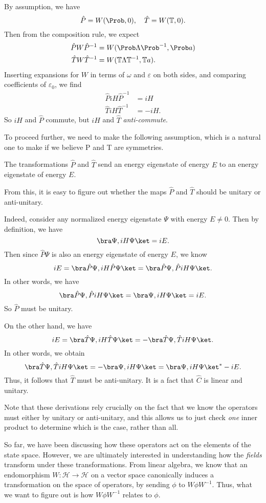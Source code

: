 \documentclass[a4paper]{article}
\begin{document}
By assumption, we have
\[
  \hat{P} = W(\Prob, 0),\quad \hat{T} = W(\mathbb{T}, 0).
\]
Then from the composition rule, we expect
\begin{align*}
  \hat{P} W \hat{P}^{-1} &= W(\Prob \Lambda \Prob^{-1}, \Prob a)\\
  \hat{T} W \hat{T}^{-1} &= W(\mathbb{T} \Lambda \mathbb{T}^{-1}, \mathbb{T} a).
\end{align*}
Inserting expansions for $W$ in terms of $\omega$ and $\varepsilon$ on both sides, and comparing coefficients of $\varepsilon_0$, we find
\begin{align*}
  \hat{P} i H \hat{P}^{-1} &= iH\\
  \hat{T} iH \hat{T}^{-1} &= -iH.
\end{align*}
So $iH$ and $\hat{P}$ commute, but $iH$ and $\hat{T}$ \emph{anti-commute}.

To proceed further, we need to make the following assumption, which is a natural one to make if we believe P and T are symmetries.
\begin{assumption}
  The transformations $\hat{P}$ and $\hat{T}$ send an energy eigenstate of energy $E$ to an energy eigenstate of energy $E$.
\end{assumption}
From this, it is easy to figure out whether the maps $\hat{P}$ and $\hat{T}$ should be unitary or anti-unitary.

Indeed, consider any normalized energy eigenstate $\Psi$ with energy $E \not = 0$. Then by definition, we have
\[
  \bra \Psi, i H \Psi\ket = iE.
\]
Then since $\hat{P}\Psi$ is also an energy eigenstate of energy $E$, we know
\[
  iE = \bra \hat{P} \Psi, iH \hat{P} \Psi\ket = \bra \hat{P} \Psi, \hat{P} iH \Psi \ket.
\]
In other words, we have
\[
  \bra \hat{P} \Psi, \hat{P} iH \Psi \ket = \bra \Psi, iH \Psi \ket = iE.
\]
So $\hat{P}$ must be unitary.

On the other hand, we have
\[
  iE = \bra \hat{T} \Psi, iH \hat{T} \Psi\ket = -\bra \hat{T} \Psi, \hat{T} iH \Psi \ket.
\]
In other words, we obtain
\[
  \bra \hat{T} \Psi, \hat{T} iH \Psi \ket = -\bra \Psi, iH \Psi \ket = \bra \Psi, iH\Psi\ket^* -iE.
\]
Thus, it follows that $\hat{T}$ must be anti-unitary. It is a fact that $\hat{C}$ is linear and unitary.

Note that these derivations rely crucially on the fact that we know the operators must either by unitary or anti-unitary, and this allows us to just check \emph{one} inner product to determine which is the case, rather than all.

So far, we have been discussing how these operators act on the elements of the state space. However, we are ultimately interested in understanding how the \emph{fields} transform under these transformations. From linear algebra, we know that an endomorphism $W: \mathcal{H} \to \mathcal{H}$ on a vector space canonically induces a transformation on the space of operators, by sending $\phi$ to $W\phi W^{-1}$. Thus, what we want to figure out is how $W \phi W^{-1}$ relates to $\phi$.
\end{document}
